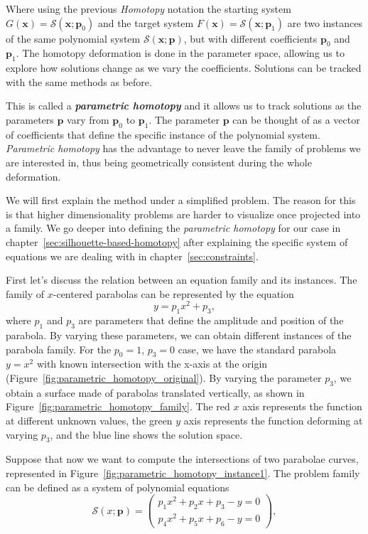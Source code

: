 Where using the previous \emph{Homotopy} notation the starting system $G(\mathbf{x}) = \mathcal{S}(\mathbf{x}; \mathbf{p}_0)$ and the target system $F(\mathbf{x}) = \mathcal{S}(\mathbf{x}; \mathbf{p}_1)$ are two instances of the same polynomial system $\mathcal{S}(\mathbf{x}; \mathbf{p})$, but with different coefficients $\mathbf{p}_0$ and $\mathbf{p}_1$. The homotopy deformation is done in the parameter space, allowing us to explore how solutions change as we vary the coefficients. Solutions can be tracked with the same methods as before.

This is called a \emph{\textbf{parametric homotopy}} and it allows us to track solutions as the parameters \(\mathbf{p}\) vary from \(\mathbf{p}_0\) to \(\mathbf{p}_1\). The parameter \(\mathbf{p}\) can be thought of as a vector of coefficients that define the specific instance of the polynomial system. \emph{Parametric homotopy} has the advantage to never leave the family of problems we are interested in, thus being geometrically consistent during the whole deformation.

We will first explain the method under a simplified problem. The reason for this is that higher dimensionality problems are harder to visualize once projected into a family.
We go deeper into defining the \emph{parametric homotopy} for our case in chapter~\ref{sec:silhouette-based-homotopy} after explaining the specific system of equations we are dealing with in chapter~\ref{sec:constraints}.

First let's discuss the relation between an equation family and its instances.
The family of $x$-centered parabolas can be represented by the equation
\[
y = p_1 x^2 + p_3,
\]
where \(p_1\) and \(p_3\) are parameters that define the amplitude and position of the parabola. By varying these parameters, we can obtain different instances of the parabola family. For the $p_0=1$, $p_3=0$ case, we have the standard parabola \(y = x^2\) with known intersection with the x-axis at the origin (Figure~\ref{fig:parametric_homotopy_original}). 
By varying the parameter \(p_3\), we obtain a surface made of parabolas translated vertically, as shown in Figure~\ref{fig:parametric_homotopy_family}. The red $x$ axis represents the function at different unknown values, the green $y$ axis represents the function deforming at varying $p_3$, and the blue line shows the solution space.

Suppose that now we want to compute the intersections of two parabolae curves, represented in Figure~\ref{fig:parametric_homotopy_instance1}.
The problem family can be defined as a system of polynomial equations
\[
\mathcal{S}(x; \mathbf{p}) = \begin{pmatrix}
p_1 x^2 + p_2 x + p_3 - y = 0 \\
p_4 x^2 + p_5 x + p_6 - y = 0
\end{pmatrix},
\label{eq:parametric_homotopy_system}
\]

